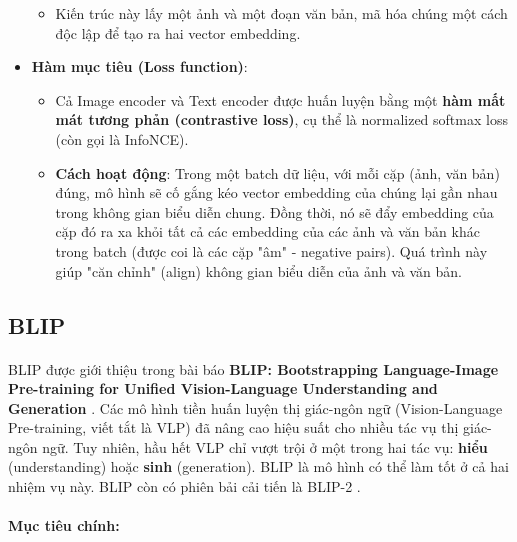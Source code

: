 \begin{itemize}
\begin{itemize}
        \item Kiến trúc này lấy một ảnh và một đoạn văn bản, mã hóa chúng một cách độc lập để tạo ra hai vector embedding.
    \end{itemize}

    \item \textbf{Hàm mục tiêu (Loss function)}:
    \begin{itemize}
        \item Cả Image encoder và Text encoder được huấn luyện bằng một \textbf{hàm mất mát tương phản (contrastive loss)}, cụ thể là normalized softmax loss (còn gọi là InfoNCE).
        \item \textbf{Cách hoạt động}: Trong một batch dữ liệu, với mỗi cặp (ảnh, văn bản) đúng, mô hình sẽ cố gắng kéo vector embedding của chúng lại gần nhau trong không gian biểu diễn chung. Đồng thời, nó sẽ đẩy embedding của cặp đó ra xa khỏi tất cả các embedding của các ảnh và văn bản khác trong batch (được coi là các cặp "âm" - negative pairs). Quá trình này giúp "căn chỉnh" (align) không gian biểu diễn của ảnh và văn bản.
    \end{itemize}

\end{itemize}

\subsection{BLIP}
\paragraph{}{BLIP được giới thiệu trong bài báo \textbf{BLIP: Bootstrapping Language-Image Pre-training for Unified Vision-Language Understanding and Generation} \cite{li2022blipbootstrappinglanguageimagepretraining}. Các mô hình tiền huấn luyện thị giác-ngôn ngữ (Vision-Language Pre-training, viết tắt là VLP) đã nâng cao hiệu suất cho nhiều tác vụ thị giác-ngôn ngữ. Tuy nhiên, hầu hết VLP chỉ vượt trội ở một trong hai tác vụ: \textbf{hiểu} (understanding) hoặc \textbf{sinh} (generation). BLIP là mô hình có thể làm tốt ở cả hai nhiệm vụ này. BLIP còn có phiên bải cải tiến là BLIP-2 \cite{li2023blip2bootstrappinglanguageimagepretraining}.}

\paragraph{}{\textbf{Mục tiêu chính:}}

